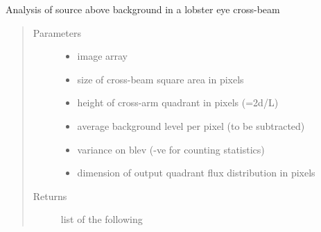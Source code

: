 \documentclass[letterpaper,10pt,english]{sphinxmanual}
\begin{document}
\begin{fulllineitems}
\label{\detokenize{images_functions:images.lecbeam}}
Analysis of source above background in a lobster eye cross-beam
\begin{quote}\begin{description}
\item[{Parameters}] \leavevmode\begin{itemize}
\item {} 
 \textendash{} image array

\item {} 
 \textendash{} size of cross-beam square area in pixels

\item {} 
 \textendash{} height of cross-arm quadrant in pixels (=2d/L)

\item {} 
 \textendash{} average background level per pixel (to be subtracted)

\item {} 
 \textendash{} variance on blev (-ve for counting statistics)

\item {} 
 \textendash{} dimension of output quadrant flux distribution in pixels

\end{itemize}

\item[{Returns}] \leavevmode
list of the following

\end{description}\end{quote}


\end{fulllineitems}
\end{document}
